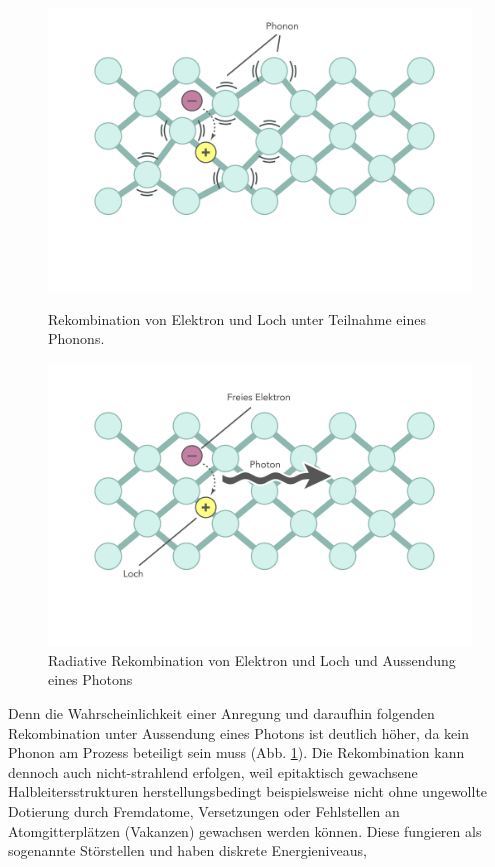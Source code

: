 \begin{figure}[htb]
    \centering
    \begin{minipage}[t]{0.49\linewidth}
        \centering
        \includegraphics[width=\linewidth]{Bilder/nonradRekomb.png}
        \caption{Rekombination von Elektron und Loch unter Teilnahme eines Phonons.}
				\label{fig:rekombphoton}
    \end{minipage}%
    \hfill
    \begin{minipage}[t]{0.49\linewidth}
        \centering
        \includegraphics[width=\linewidth]{Bilder/radRekomb.png}
        \caption{Radiative Rekombination von Elektron und Loch und Aussendung eines Photons}
    \end{minipage}
\end{figure}
\noindent
Denn die Wahrscheinlichkeit einer Anregung und daraufhin folgenden Rekombination unter Aussendung eines Photons ist deutlich höher, da kein Phonon am Prozess beteiligt sein muss (Abb. \ref{fig:rekombphoton}). Die Rekombination kann dennoch auch nicht-strahlend erfolgen, weil epitaktisch gewachsene Halbleitersstrukturen herstellungsbedingt beispielsweise nicht ohne ungewollte Dotierung durch Fremdatome, Versetzungen oder Fehlstellen an Atomgitterplätzen (Vakanzen) gewachsen werden können. Diese fungieren als sogenannte Störstellen und haben diskrete Energieniveaus, 
